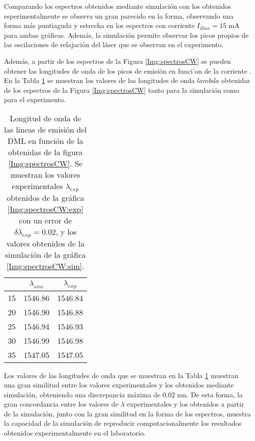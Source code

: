 				Comparando los espectros obtenidos mediante simulación con los obtenidos esperimentalmente se observa un gran parecido en la forma, observando una forma m\'as puntiaguda y estrecha en los espectros con corriente $I_{Bias}= 15$ mA para ambas gr\'aficas. Adem\'as, la simulación permite observar los picos propios de las oscilaciones de relajaci\'on del l\'aser que se observan en el experimento.

				Adem\'as, a partir de los espectros de la Figura \ref{Img:spectrosCW} se pueden obtener las longitudes de onda de los picos de emisión en funci'on de la corriente \ibias. En la Tabla \ref{tab:lambdas} se muestran los valores de las longitudes de onda $lambda$ obtenidas de los espectros de la Figura \ref{Img:spectrosCW} tanto para la simulaci\'on como para el experimento.
 
				\begin{table}[H]
					\centering
					\begin{tabular}{c c c}
						\hline
						\ibias & $\lambda_{sim}$ & $\lambda_{exp}$ \\\hline 
						15 & 1546.86 & 1546.84 \\
						20 & 1546.90 & 1546.88 \\
						25 & 1546.94 & 1546.93 \\
						30 & 1546.99 & 1546.98 \\
						35 & 1547.05 & 1547.05 \\\hline
					\end{tabular}
					\caption{\label{tab:lambdas}Longitud de onda de las lineas de emisión del DML en función de la \ibias obtenidas de la figura \ref{Img:spectrosCW}. Se muestran los valores experimentales $\lambda_{exp}$ obtenidos de la gráfica \ref{Img:spectrosCW:exp} con un error de $\delta\lambda_{exp} = 0.02$, y los valores obtenidos de la simulación de la gráfica \ref{Img:spectrosCW:sim}.}
				\end{table}

			Los valores de las longitudes de onda que se muestran en la Tabla \ref{tab:lambdas} muestran una gran similitud entre los valores experimentales y los obtenidos mediante simulación, obteniendo una discrepancia m\'axima de $0.02$ nm. De esta forma, la gran concordancia entre los valores de $\lambda$ experimentales y los obtenidos a partir de la simulaci\'on, junto con la gran similitud en la forma de los espectros, muestra la capacidad de la simulaci\'on de reproducir computacionalmente los resultados obtenidos experimentalmente en el laboratorio.

